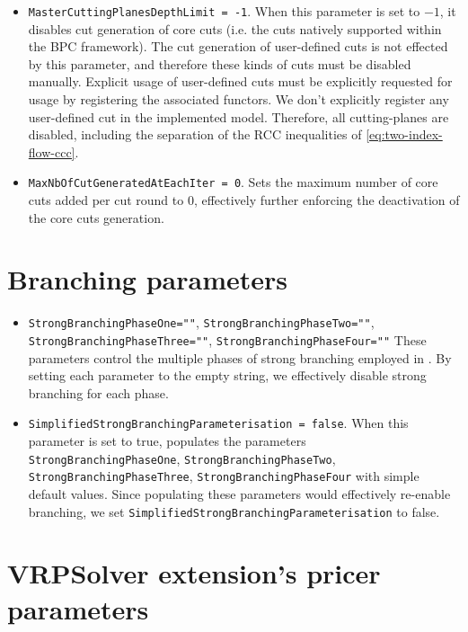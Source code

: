 \begin{itemize}
	\item \texttt{MasterCuttingPlanesDepthLimit = -1}.
	      When this parameter is set to $-1$, it disables cut generation of core cuts
	      (i.e. the cuts natively supported within the BPC framework).
	      The cut generation of user-defined cuts
	      is not effected by this parameter, and therefore these kinds of cuts must be disabled manually.
	      Explicit usage of user-defined cuts must be explicitly requested for usage
	      by registering the associated functors.
	      We don't explicitly register any user-defined cut in the implemented model.
	      Therefore, all cutting-planes are disabled, including the separation of the RCC inequalities of \cref{eq:two-index-flow-ccc}.
	\item \texttt{MaxNbOfCutGeneratedAtEachIter = 0}.
	      Sets the maximum number of core cuts added per cut round to $0$,
	      effectively further enforcing the deactivation of the core cuts generation.
\end{itemize}

\section{Branching parameters}

\begin{itemize}
	\item \texttt{StrongBranchingPhaseOne=""}, \texttt{StrongBranchingPhaseTwo=""}, \texttt{StrongBranchingPhaseThree=""}, \texttt{StrongBranchingPhaseFour=""}
	      These parameters control the multiple phases of strong branching employed in \bapcod.
	      By setting each parameter to the empty string, we effectively disable strong branching for each phase.
	\item \texttt{SimplifiedStrongBranchingParameterisation = false}.
	      When this parameter is set to true, \bapcod populates the parameters \texttt{StrongBranchingPhaseOne}, \texttt{StrongBranchingPhaseTwo}, \texttt{StrongBranchingPhaseThree}, \texttt{StrongBranchingPhaseFour}
	      with simple default values.
	      Since populating these parameters would effectively re-enable branching, we set \texttt{SimplifiedStrongBranchingParameterisation} to false.
\end{itemize}

\section{VRPSolver extension's pricer parameters}

